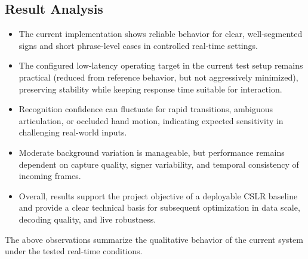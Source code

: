 \subsection{Result Analysis}
\begin{itemize}[leftmargin=1.5em]
\item The current implementation shows reliable behavior for clear, well-segmented signs and short phrase-level cases in controlled real-time settings.
\item The configured low-latency operating target in the current test setup remains practical (reduced from reference behavior, but not aggressively minimized), preserving stability while keeping response time suitable for interaction.
\item Recognition confidence can fluctuate for rapid transitions, ambiguous articulation, or occluded hand motion, indicating expected sensitivity in challenging real-world inputs.
\item Moderate background variation is manageable, but performance remains dependent on capture quality, signer variability, and temporal consistency of incoming frames.
\item Overall, results support the project objective of a deployable CSLR baseline and provide a clear technical basis for subsequent optimization in data scale, decoding quality, and live robustness.
\end{itemize}

The above observations summarize the qualitative behavior of the current system under the tested real-time conditions.

